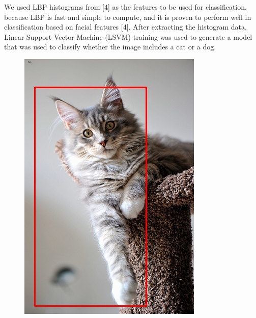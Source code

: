 \documentclass[conference,compsoc]{IEEEtran}
\begin{document}
We used LBP histograms from [4] as the features to be used for classification, because LBP is fast and simple to compute, and it is proven to perform well in classification based on facial features [4]. After extracting the histogram data, Linear Support Vector Machine (LSVM) training was used to generate a model that was used to classify whether the image includes a cat or a dog.
\begin{figure}
	\begin{multicols}{4}
    		\includegraphics[height=1.35\linewidth]{naisubodi2.jpg}\par 

\end{multicols}
\end{figure}
\end{document}
